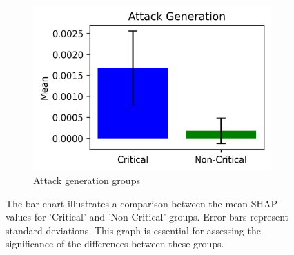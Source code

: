 \documentclass[10pt, conference, a4paper, final]{IEEEtran}
\begin{document}
\begin{figure}[ht!]
\begin{subfigure}{.31\textwidth}
            \includegraphics[width=\linewidth]{paper_images/Generationbar_chart.png}
            \caption{Attack generation groups}
        \end{subfigure}
        \caption{The bar chart illustrates a comparison between the mean SHAP values for 'Critical' and 'Non-Critical' groups. Error bars represent standard deviations. This graph is essential for assessing the significance of the differences between these groups.}
        \label{fig:bar_chart}
    \end{figure}
    
\end{document}
